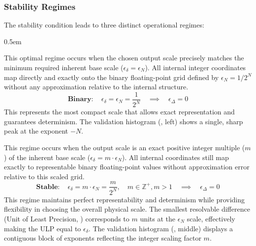 \documentclass[10pt]{article}
\begin{document}
\subsubsection{Stability Regimes}\label{subsubsec-stability-regimes}
The stability condition leads to three distinct operational regimes:

\begin{description} \itemsep0.5em
    \item[Binary Scaling ($\epsilon_\Delta = 0$ with $m=1$):] This optimal regime occurs when the chosen output scale precisely matches the minimum required inherent base scale ($\epsilon_\delta = \epsilon_N$). All internal integer coordinates map directly and exactly onto the binary floating-point grid defined by $\epsilon_N = 1/2^N$ without any approximation relative to the internal structure.
    \begin{equation}\label{eq-scaling-binary}
    \textbf{Binary}: \quad \epsilon_\delta = \epsilon_N = \frac{1}{2^N} \quad \implies \quad \epsilon_\Delta = 0
    \end{equation}
    This represents the most compact scale that allows exact representation and guarantees determinism. The validation histogram (, left) shows a single, sharp peak at the exponent $-N$.

    \item[Stable Scaling ($\epsilon_\Delta = 0$ with $m > 1$):] This regime occurs when the output scale is an exact positive integer multiple ($m$) of the inherent base scale ($\epsilon_\delta = m \cdot \epsilon_N$). All internal coordinates still map exactly to representable binary floating-point values without approximation error relative to this scaled grid.
    \begin{equation}\label{eq-scaling-stable}
    \textbf{Stable}: \quad \epsilon_\delta = m \cdot \epsilon_N = \frac{m}{2^N}, \quad m \in \mathbb{Z}^+, m > 1 \quad \implies \quad \epsilon_\Delta = 0
    \end{equation}
    This regime maintains perfect representability and determinism while providing flexibility in choosing the overall physical scale. The smallest resolvable difference (Unit of Least Precision, ) corresponds to $m$ units at the $\epsilon_N$ scale, effectively making the ULP equal to $\epsilon_\delta$. The validation histogram (, middle) displays a contiguous block of exponents reflecting the integer scaling factor $m$.


\end{description}
\end{document}
